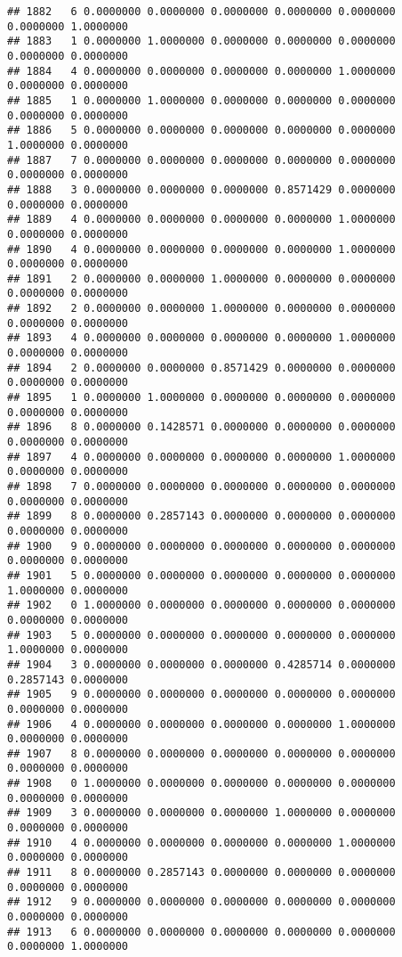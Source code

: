 \documentclass[
]{article}
\begin{document}
\begin{verbatim}
## 1882   6 0.0000000 0.0000000 0.0000000 0.0000000 0.0000000 0.0000000 1.0000000
## 1883   1 0.0000000 1.0000000 0.0000000 0.0000000 0.0000000 0.0000000 0.0000000
## 1884   4 0.0000000 0.0000000 0.0000000 0.0000000 1.0000000 0.0000000 0.0000000
## 1885   1 0.0000000 1.0000000 0.0000000 0.0000000 0.0000000 0.0000000 0.0000000
## 1886   5 0.0000000 0.0000000 0.0000000 0.0000000 0.0000000 1.0000000 0.0000000
## 1887   7 0.0000000 0.0000000 0.0000000 0.0000000 0.0000000 0.0000000 0.0000000
## 1888   3 0.0000000 0.0000000 0.0000000 0.8571429 0.0000000 0.0000000 0.0000000
## 1889   4 0.0000000 0.0000000 0.0000000 0.0000000 1.0000000 0.0000000 0.0000000
## 1890   4 0.0000000 0.0000000 0.0000000 0.0000000 1.0000000 0.0000000 0.0000000
## 1891   2 0.0000000 0.0000000 1.0000000 0.0000000 0.0000000 0.0000000 0.0000000
## 1892   2 0.0000000 0.0000000 1.0000000 0.0000000 0.0000000 0.0000000 0.0000000
## 1893   4 0.0000000 0.0000000 0.0000000 0.0000000 1.0000000 0.0000000 0.0000000
## 1894   2 0.0000000 0.0000000 0.8571429 0.0000000 0.0000000 0.0000000 0.0000000
## 1895   1 0.0000000 1.0000000 0.0000000 0.0000000 0.0000000 0.0000000 0.0000000
## 1896   8 0.0000000 0.1428571 0.0000000 0.0000000 0.0000000 0.0000000 0.0000000
## 1897   4 0.0000000 0.0000000 0.0000000 0.0000000 1.0000000 0.0000000 0.0000000
## 1898   7 0.0000000 0.0000000 0.0000000 0.0000000 0.0000000 0.0000000 0.0000000
## 1899   8 0.0000000 0.2857143 0.0000000 0.0000000 0.0000000 0.0000000 0.0000000
## 1900   9 0.0000000 0.0000000 0.0000000 0.0000000 0.0000000 0.0000000 0.0000000
## 1901   5 0.0000000 0.0000000 0.0000000 0.0000000 0.0000000 1.0000000 0.0000000
## 1902   0 1.0000000 0.0000000 0.0000000 0.0000000 0.0000000 0.0000000 0.0000000
## 1903   5 0.0000000 0.0000000 0.0000000 0.0000000 0.0000000 1.0000000 0.0000000
## 1904   3 0.0000000 0.0000000 0.0000000 0.4285714 0.0000000 0.2857143 0.0000000
## 1905   9 0.0000000 0.0000000 0.0000000 0.0000000 0.0000000 0.0000000 0.0000000
## 1906   4 0.0000000 0.0000000 0.0000000 0.0000000 1.0000000 0.0000000 0.0000000
## 1907   8 0.0000000 0.0000000 0.0000000 0.0000000 0.0000000 0.0000000 0.0000000
## 1908   0 1.0000000 0.0000000 0.0000000 0.0000000 0.0000000 0.0000000 0.0000000
## 1909   3 0.0000000 0.0000000 0.0000000 1.0000000 0.0000000 0.0000000 0.0000000
## 1910   4 0.0000000 0.0000000 0.0000000 0.0000000 1.0000000 0.0000000 0.0000000
## 1911   8 0.0000000 0.2857143 0.0000000 0.0000000 0.0000000 0.0000000 0.0000000
## 1912   9 0.0000000 0.0000000 0.0000000 0.0000000 0.0000000 0.0000000 0.0000000
## 1913   6 0.0000000 0.0000000 0.0000000 0.0000000 0.0000000 0.0000000 1.0000000

\end{verbatim}
\end{document}
